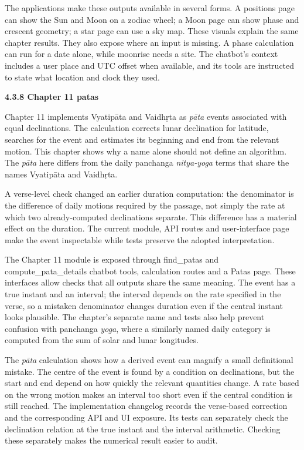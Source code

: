 \documentclass[
]{article}
\begin{document}
The applications make these outputs available in several forms. A
positions page can show the Sun and Moon on a zodiac wheel; a Moon page
can show phase and crescent geometry; a star page can use a sky map.
These visuals explain the same chapter results. They also expose where
an input is missing. A phase calculation can run for a date alone, while
moonrise needs a site. The chatbot's context includes a user place and
UTC offset when available, and its tools are instructed to state what
location and clock they used.

\textbf{4.3.8 Chapter 11 patas}

Chapter 11 implements Vyatipāta and Vaidhṛta as \emph{pāta} events
associated with equal declinations. The calculation corrects lunar
declination for latitude, searches for the event and estimates its
beginning and end from the relevant motion. This chapter shows why a
name alone should not define an algorithm. The \emph{pāta} here differs
from the daily panchanga \emph{nitya-yoga} terms that share the names
Vyatipāta and Vaidhṛta.

A verse-level check changed an earlier duration computation: the
denominator is the difference of daily motions required by the passage,
not simply the rate at which two already-computed declinations separate.
This difference has a material effect on the duration. The current
module, API routes and user-interface page make the event inspectable
while tests preserve the adopted interpretation.

The Chapter 11 module is exposed through find\_patas and
compute\_pata\_details chatbot tools, calculation routes and a Patas
page. These interfaces allow checks that all outputs share the same
meaning. The event has a true instant and an interval; the interval
depends on the rate specified in the verse, so a mistaken denominator
changes duration even if the central instant looks plausible. The
chapter's separate name and tests also help prevent confusion with
panchanga \emph{yoga}, where a similarly named daily category is
computed from the sum of solar and lunar longitudes.

The \emph{pāta} calculation shows how a derived event can magnify a
small definitional mistake. The centre of the event is found by a
condition on declinations, but the start and end depend on how quickly
the relevant quantities change. A rate based on the wrong motion makes
an interval too short even if the central condition is still reached.
The implementation changelog records the verse-based correction and the
corresponding API and UI exposure. Its tests can separately check the
declination relation at the true instant and the interval arithmetic.
Checking these separately makes the numerical result easier to audit.
\end{document}
